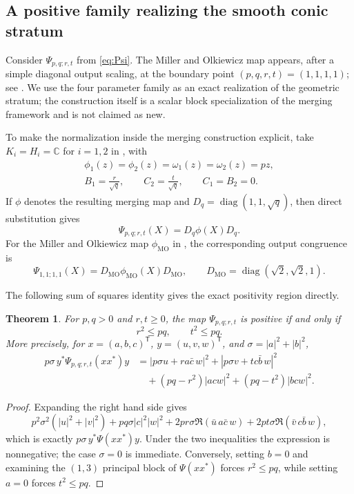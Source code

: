 \documentclass[11pt]{amsart}
\newcommand{\chg}[1]{#1}
\theoremstyle{plain}
\newtheorem{theorem}{Theorem}[section]
\theoremstyle{definition}
\theoremstyle{remark}
\begin{document}
\subsection{A positive family realizing the \chg{smooth conic} stratum}\label{subsec:positive-family}

Consider $\Psi_{p,q;r,t}$ from \eqref{eq:Psi}. The Miller and Olkiewicz map appears, after a simple diagonal output scaling, at the boundary point $(p,q,r,t)=(1,1,1,1)$; see \cite{MillerOlkiewicz2015,MarciniakRutkowski2017}. We use the \chg{four parameter} family as an exact realization of the geometric stratum; the construction itself is a \chg{scalar block} specialization of the merging framework and is not claimed as new.

To make the normalization inside the merging construction explicit, take $K_i=H_i=\mathbb C$ for $i=1,2$ in \cite[Definition~3.2 and (3.1)]{MarciniakRutkowski2017}, with
\[
\begin{gathered}
\phi_1(z)=\phi_2(z)=\omega_1(z)=\omega_2(z)=pz,\\
B_1=\frac r{\sqrt q},\qquad C_2=\frac t{\sqrt q},\qquad C_1=B_2=0.
\end{gathered}
\]
If $\phi$ denotes the resulting merging map and $D_q=\operatorname{diag}(1,1,\sqrt q)$, then direct substitution gives
\[
\Psi_{p,q;r,t}(X)=D_q\phi(X)D_q.
\]
For the Miller and Olkiewicz map $\phi_{\mathrm{MO}}$ in \cite[Example~3.4]{MarciniakRutkowski2017}, the corresponding output congruence is
\[
\Psi_{1,1;1,1}(X)=D_{\mathrm{MO}}\phi_{\mathrm{MO}}(X)D_{\mathrm{MO}},
\qquad
D_{\mathrm{MO}}=\operatorname{diag}(\sqrt2,\sqrt2,1).
\]

\chg{The following sum of squares identity gives the exact positivity region directly.}

\begin{theorem}\label{thm:exact-positivity}
For $p,q>0$ and $r,t\ge0$, the map $\Psi_{p,q;r,t}$ is positive if and only if
\[
r^2\le pq,\qquad t^2\le pq.
\]
More precisely, for $x=(a,b,c)^{\mathsf T}$, $y=(u,v,w)^{\mathsf T}$, and $\sigma=|a|^2+|b|^2$,
\begin{align}
 p\sigma\,y^*\Psi_{p,q;r,t}(xx^*)y
 &=|p\sigma u+r a\bar c\,w|^2+|p\sigma v+t c\bar b\,w|^2 \label{eq:sos-positivity}\\
 &\quad +(pq-r^2)|acw|^2+(pq-t^2)|bcw|^2.\nonumber
\end{align}
\end{theorem}

\begin{proof}
Expanding the right hand side gives
\[
p^2\sigma^2(|u|^2+|v|^2)+pq\sigma|c|^2|w|^2
+2pr\sigma\Re(\bar u\,a\bar c\,w)
+2pt\sigma\Re(\bar v\,c\bar b\,w),
\]
which is exactly $p\sigma\,y^*\Psi(xx^*)y$. Under the two inequalities the expression is nonnegative; the case $\sigma=0$ is immediate. Conversely, setting $b=0$ and examining the $(1,3)$ principal block of $\Psi(xx^*)$ forces $r^2\le pq$, while setting $a=0$ forces $t^2\le pq$.
\end{proof}
\end{document}
